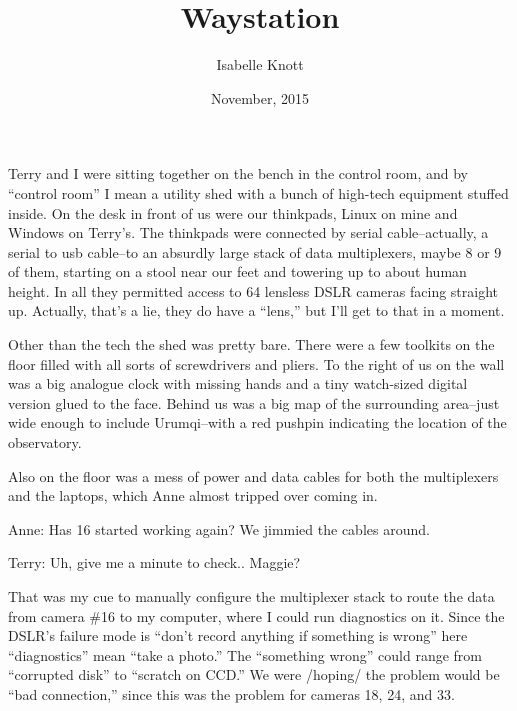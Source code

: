 \documentclass[a5paper,10pt]{book}
\newenvironment{dialogue}
{
\it
\renewcommand{\:}{\rm:}
\PushPreHook{par}{\it}

\begin{changemargin}{ 0.4 in}{ 0.4in}
\addtolength{\parskip}{0.1em}
}
{
\addtolength{\parskip}{-0.1em}
\end{changemargin}

\PopPreHook{par}
}
\begin{document}
\title{Waystation} 
\author{Isabelle Knott}
\date{November, 2015}
\maketitle{}

\tableofcontents 

\chapter{}

Terry and I were sitting together on the bench in the control room, and by ``control room'' I mean a utility shed with a bunch of high-tech equipment stuffed inside. On the desk in front of us were our thinkpads, Linux on mine and Windows on Terry's. The thinkpads were connected by serial cable--actually, a serial to usb cable--to an absurdly large stack of data multiplexers, maybe 8 or 9 of them, starting on a stool near our feet and towering up to about human height. In all they permitted access to 64 lensless DSLR cameras facing straight up. Actually, that's a lie, they do have a ``lens,'' but I'll get to that in a moment.

Other than the tech the shed was pretty bare. There were a few toolkits on the floor filled with all sorts of screwdrivers and pliers. To the right of us on the wall was a big analogue clock with missing hands and a tiny watch-sized digital version glued to the face. Behind us was a big map of the surrounding area--just wide enough to include Urumqi--with a red pushpin indicating the location of the observatory.

Also on the floor was a mess of power and data cables for both the multiplexers and the laptops, which Anne almost tripped over coming in.

\begin{dialogue}
  Anne\: Has 16 started working again? We jimmied the cables around.

  Terry\: Uh, give me a minute to check.. Maggie?
\end{dialogue}

That was my cue to manually configure the multiplexer stack to route the data from camera \#16 to my computer, where I could run diagnostics on it. Since the DSLR's failure mode is ``don't record anything if something is wrong'' here ``diagnostics'' mean ``take a photo.'' The ``something wrong'' could range from ``corrupted disk'' to ``scratch on CCD.'' We were /hoping/ the problem would be ``bad connection,'' since this was the problem for cameras 18, 24, and 33.
\end{document}

